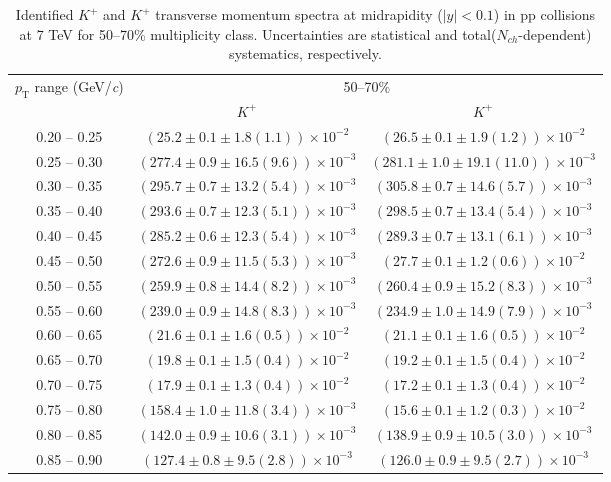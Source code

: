 \begin{table}
\caption{Identified $K^{+}$ and $K^{+}$  transverse momentum spectra at midrapidity ($|y|<0.1$) in pp collisions at 7 TeV for 50--70\% multiplicity class. Uncertainties are statistical and total($N_{ch}$-dependent) systematics, respectively.}
\label{tab:KaonPlus_KaonMinus_50to70}
\begin{center}
\begin{tabular}{ c | c c }
\hline
\multirow{2}{*}{$p_{\mathrm{T}}$ range (GeV/\textit{c})} & \multicolumn{2}{c}{50--70\%} \\ & $K^{+}$& $K^{+}$\\ 
\hline
0.20 -- 0.25 & $(25.2\pm0.1\pm1.8(1.1))\times10^{-2}$ & $(26.5\pm0.1\pm1.9(1.2))\times10^{-2}$ \\ 
0.25 -- 0.30 & $(277.4\pm0.9\pm16.5(9.6))\times10^{-3}$ & $(281.1\pm1.0\pm19.1(11.0))\times10^{-3}$ \\ 
0.30 -- 0.35 & $(295.7\pm0.7\pm13.2(5.4))\times10^{-3}$ & $(305.8\pm0.7\pm14.6(5.7))\times10^{-3}$ \\ 
0.35 -- 0.40 & $(293.6\pm0.7\pm12.3(5.1))\times10^{-3}$ & $(298.5\pm0.7\pm13.4(5.4))\times10^{-3}$ \\ 
0.40 -- 0.45 & $(285.2\pm0.6\pm12.3(5.4))\times10^{-3}$ & $(289.3\pm0.7\pm13.1(6.1))\times10^{-3}$ \\ 
0.45 -- 0.50 & $(272.6\pm0.9\pm11.5(5.3))\times10^{-3}$ & $(27.7\pm0.1\pm1.2(0.6))\times10^{-2}$ \\ 
0.50 -- 0.55 & $(259.9\pm0.8\pm14.4(8.2))\times10^{-3}$ & $(260.4\pm0.9\pm15.2(8.3))\times10^{-3}$ \\ 
0.55 -- 0.60 & $(239.0\pm0.9\pm14.8(8.3))\times10^{-3}$ & $(234.9\pm1.0\pm14.9(7.9))\times10^{-3}$ \\ 
0.60 -- 0.65 & $(21.6\pm0.1\pm1.6(0.5))\times10^{-2}$ & $(21.1\pm0.1\pm1.6(0.5))\times10^{-2}$ \\ 
0.65 -- 0.70 & $(19.8\pm0.1\pm1.5(0.4))\times10^{-2}$ & $(19.2\pm0.1\pm1.5(0.4))\times10^{-2}$ \\ 
0.70 -- 0.75 & $(17.9\pm0.1\pm1.3(0.4))\times10^{-2}$ & $(17.2\pm0.1\pm1.3(0.4))\times10^{-2}$ \\ 
0.75 -- 0.80 & $(158.4\pm1.0\pm11.8(3.4))\times10^{-3}$ & $(15.6\pm0.1\pm1.2(0.3))\times10^{-2}$ \\ 
0.80 -- 0.85 & $(142.0\pm0.9\pm10.6(3.1))\times10^{-3}$ & $(138.9\pm0.9\pm10.5(3.0))\times10^{-3}$ \\ 
0.85 -- 0.90 & $(127.4\pm0.8\pm9.5(2.8))\times10^{-3}$ & $(126.0\pm0.9\pm9.5(2.7))\times10^{-3}$ \\ 

\end{tabular}
\end{center}
\end{table}

